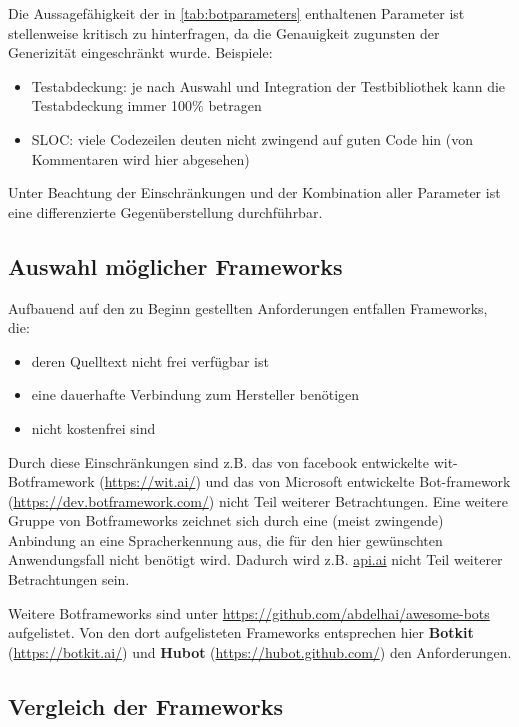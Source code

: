 Die Aussagefähigkeit der in \autoref{tab:botparameters} enthaltenen Parameter ist stellenweise kritisch zu hinterfragen, da die Genauigkeit zugunsten der Generizität eingeschränkt wurde. 
Beispiele:
\begin{itemize}
    \item Testabdeckung: je nach Auswahl und Integration der Testbibliothek kann die Testabdeckung immer 100\% betragen
\item SLOC: viele Codezeilen deuten nicht zwingend auf guten Code hin (von Kommentaren wird hier abgesehen)
\end{itemize}

Unter Beachtung der Einschränkungen und der Kombination aller Parameter ist eine differenzierte Gegenüberstellung durchführbar.

\subsection{Auswahl möglicher Frameworks}

Aufbauend auf den zu Beginn gestellten Anforderungen entfallen Frameworks, die:
\begin{itemize}
    \item deren Quelltext nicht frei verfügbar ist
    \item eine dauerhafte Verbindung zum Hersteller benötigen
    \item nicht kostenfrei sind
\end{itemize}

Durch diese Einschränkungen sind z.B. das von facebook entwickelte wit-Botframework (\url{https://wit.ai/}) und das von Microsoft entwickelte Bot-framework (\url{https://dev.botframework.com/}) nicht Teil weiterer Betrachtungen.
Eine weitere Gruppe von Botframeworks zeichnet sich durch eine (meist zwingende) Anbindung an eine Spracherkennung aus, die für den hier gewünschten Anwendungsfall nicht benötigt wird. Dadurch wird z.B. \url{api.ai} nicht Teil weiterer Betrachtungen sein.


Weitere Botframeworks sind unter \url{https://github.com/abdelhai/awesome-bots} aufgelistet. 
Von den dort aufgelisteten Frameworks entsprechen hier \textbf{Botkit} (\url{https://botkit.ai/}) und \textbf{Hubot} (\url{https://hubot.github.com/}) den Anforderungen.

\subsection{Vergleich der Frameworks}

